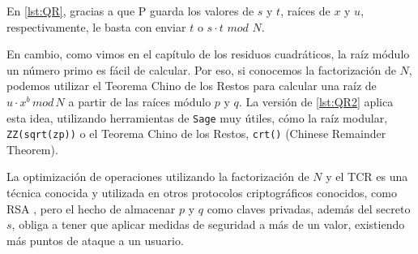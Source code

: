 En \autoref{lst:QR}, gracias a que P guarda los valores de $s$ y $t$, raíces de $x$ y $u$, respectivamente, le basta con enviar $t$ o $s\cdot t$ $mod$ $N$.

En cambio, como vimos en el capítulo de los residuos cuadráticos, la raíz módulo un número primo es fácil de calcular. Por eso, si conocemos la factorización de $N$, podemos utilizar el Teorema Chino de los Restos para calcular una raíz de $u\cdot x^b \, mod \, N$ a partir de las raíces módulo $p$ y $q$. La versión de \autoref{lst:QR2} aplica esta idea, utilizando herramientas de \texttt{Sage} muy útiles, cómo la raíz modular, \texttt{ZZ(sqrt(zp))} o el Teorema Chino de los Restos, \texttt{crt()} (Chinese Remainder Theorem).

\hfil

La optimización de operaciones utilizando la factorización de $N$ y el TCR es una técnica conocida y utilizada en otros protocolos criptográficos conocidos, como RSA \citep{book:1210287}, pero el hecho de almacenar $p$ y $q$ como claves privadas, además del secreto $s$, obliga a tener que aplicar medidas de seguridad a más de un valor, existiendo más puntos de ataque a un usuario.



